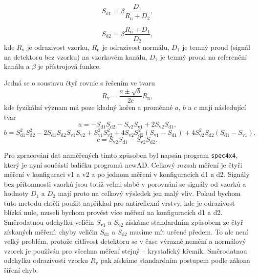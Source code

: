 \begin{equation}
S_\mathrm{d1} = \beta \frac{D_1}{R_\mathrm{n} + D_2} \text{,}
\end{equation}

\begin{equation}
S_\mathrm{d2} = \beta \frac{R_\mathrm{n} + D_1}{D_2} \text{,}
\end{equation}
kde $R_\mathrm{v}$ je odrazivost vzorku, $R_\mathrm{n}$ je odrazivost normálu, $D_1$ je temný proud (signál na detektoru bez vzorku) na vzorkovém kanálu, $D_1$ je temný proud na referenční kanálu a $\beta$ je přístrojová funkce. 

Jedná se o soustavu čtyř rovnic s řešením ve tvaru
\begin{equation}
R_\mathrm{v} = \frac{a \pm \sqrt{b}}{2c} R_\mathrm{n} \text{,}
\end{equation}
kde fyzikální význam má poze kladný kořen a proměnné $a$, $b$ a $c$ mají následující tvar
\begin{equation}
a = -S_\mathrm{d1} S_\mathrm{d2} - S_\mathrm{v2} S_\mathrm{v1} + 2 S_\mathrm{v2} S_\mathrm{d1} \text{,}
\end{equation}
\begin{equation}
b = S_\mathrm{d1}^2 S_\mathrm{d2}^2 - 2 S_\mathrm{d1} S_\mathrm{d2} S_\mathrm{v1} S_\mathrm{v2} 
				+ S_\mathrm{v1}^2 S_\mathrm{v2}^2 + 4 S_\mathrm{v2} S_\mathrm{d2}^2 (S_\mathrm{v1} - S_\mathrm{d1}) 
				+ 4 S_\mathrm{v2}^2 S_\mathrm{d2} (S_\mathrm{d1} - S_\mathrm{v1}) \text{,}
\end{equation}
\begin{equation}
c = S_\mathrm{v2} S_\mathrm{d1} - S_\mathrm{v2} S_\mathrm{d2} \text{.}
\end{equation}

Pro zpracování dat naměřených tímto způsoben byl napsán program \texttt{spec4x4}, který je nyní součástí balíčku programů newAD. Celkový rozsah měření je čtyři měření v konfiguraci v1 a v2 a po jednom měření v konfiguracích d1 a d2. Signály bez přítomnosti vzorků jsou totiž velmi slabé v porovnání se signály od vzorků a hodnoty $D_1$ a $D_2$ mají proto na celkový výsledek jen malý vliv. 
Pokud bychom tuto metodu chtěli použit například pro antireflexní vrstvy, kde je odrazivost blízká nule, museli bychom provést více měření na konfiguracích d1 a d2. 
Směrodatnou odchylku veličin $S_\mathrm{v1}$ a $S_\mathrm{v2}$ získáme standardním způsobem ze čtyř získaných měření, chyby veličin $S_\mathrm{d1}$ a $S_\mathrm{d2}$ musíme mít určené předem. To ale není velký problém, protože citlivost detektoru se v čase výrazně nemění a normálový vzorek je používán pro všechna měření stejný -- krystalický křemík. 
Směrodatnou odchylku odrazivosti vzorku $R_\mathrm{v}$ pak získáme standardním postupem podle zákona šíření chyb.   

